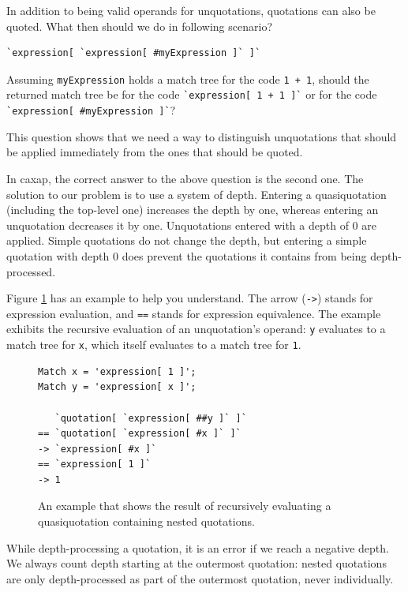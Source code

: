 In addition to being valid operands for unquotations, quotations can also be
quoted. What then should we do in following scenario?

\begin{lstlisting}
`expression[ `expression[ #myExpression ]` ]`
\end{lstlisting}

Assuming \texttt{myExpression} holds a match tree for the code \texttt{1 + 1},
should the returned match tree be for the code \lstinline{`expression[ 1 + 1 ]`}
or for the code \lstinline{`expression[ #myExpression ]`}?

This question shows that we need a way to distinguish unquotations that should
be applied immediately from the ones that should be quoted.

In caxap, the correct answer to the above question is the second one. The
solution to our problem is to use a system of depth. Entering a quasiquotation
(including the top-level one) increases the depth by one, whereas entering an
unquotation decreases it by one. Unquotations entered with a depth of 0 are
applied. Simple quotations do not change the depth, but entering a simple
quotation with depth 0 does prevent the quotations it contains from being
depth-processed.

Figure \ref{quot_ex_one} has an example to help you understand. The arrow
(\texttt{->}) stands for expression evaluation, and \texttt{==} stands for
expression equivalence. The example exhibits the recursive evaluation of an
unquotation's operand: \texttt{y} evaluates to a match tree for \texttt{x},
which itself evaluates to a match tree for \texttt{1}.

\begin{figure}[here]
\small
\begin{lstlisting}[frame=single]
Match x = 'expression[ 1 ]';
Match y = 'expression[ x ]';

   `quotation[ `expression[ ##y ]` ]`
== `quotation[ `expression[ #x ]` ]`
-> `expression[ #x ]`
== `expression[ 1 ]`
-> 1
\end{lstlisting}
\caption{An example that shows the result of recursively evaluating a
  quasiquotation containing nested quotations.}
\label{quot_ex_one}
\end{figure}

While depth-processing a quotation, it is an error if we reach a negative
depth. We always count depth starting at the outermost quotation: nested
quotations are only depth-processed as part of the outermost quotation, never
individually.

